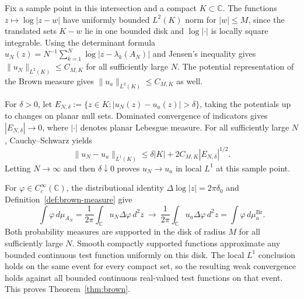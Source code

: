 Fix a sample point in this intersection and a compact $K\subset\mathbb C$.
The functions $z\mapsto\log|z-w|$ have uniformly bounded $L^2(K)$ norm for $|w|\le M$, since the translated sets $K-w$ lie in one bounded disk and $\log|\cdot|$ is locally square integrable.
Using the determinant formula $u_N(z)=N^{-1}\sum_{k=1}^N\log|z-\lambda_k(A_N)|$ and Jensen's inequality gives $\|u_N\|_{L^2(K)}\le C_{M,K}$ for all sufficiently large $N$.
The potential representation of the Brown measure gives $\|u_a\|_{L^2(K)}\le C_{M,K}$ as well.

For $\delta>0$, let $E_{N,\delta}:=\{z\in K: |u_N(z)-u_a(z)|>\delta\}$, taking the potentials up to changes on planar null sets.
Dominated convergence of indicators gives $|E_{N,\delta}|\to0$, where $|\cdot|$ denotes planar Lebesgue measure.
For all sufficiently large $N$, Cauchy--Schwarz yields
\[
 \|u_N-u_a\|_{L^1(K)}
 \le \delta |K|+2C_{M,K}|E_{N,\delta}|^{1/2}.
\]
Letting $N\to\infty$ and then $\delta\downarrow0$ proves $u_N\to u_a$ in local $L^1$ at this sample point.

For $\varphi\in C_c^\infty(\mathbb C)$, the distributional identity $\Delta\log|z|=2\pi\delta_0$ and Definition~\ref{def:brown-measure} give
\[
 \int\varphi\,d\mu_{A_N}
 =\frac{1}{2\pi}\int_{\mathbb C}u_N\Delta\varphi\,d^2z
 \ \longrightarrow\
 \frac{1}{2\pi}\int_{\mathbb C}u_a\Delta\varphi\,d^2z
 =\int\varphi\,d\mu_a^{\mathrm{Br}}.
\]
Both probability measures are supported in the disk of radius $M$ for all sufficiently large $N$.
Smooth compactly supported functions approximate any bounded continuous test function uniformly on this disk.
The local $L^1$ conclusion holds on the same event for every compact set, so the resulting weak convergence holds against all bounded continuous real-valued test functions on that event.
This proves Theorem~\ref{thm:brown}.
